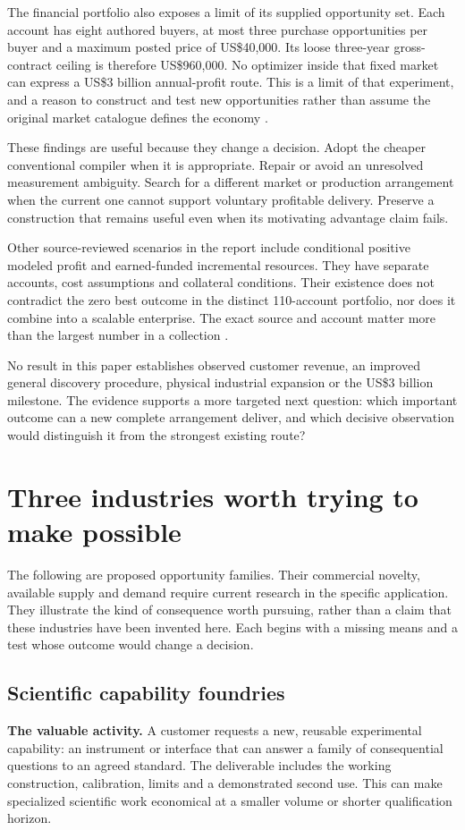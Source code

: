 \documentclass[11pt,letterpaper]{article}
\begin{document}
The financial portfolio also exposes a limit of its supplied opportunity set. Each account has eight authored buyers, at most three purchase opportunities per buyer and a maximum posted price of US\$40,000. Its loose three-year gross-contract ceiling is therefore US\$960,000. No optimizer inside that fixed market can express a US\$3 billion annual-profit route. This is a limit of that experiment, and a reason to construct and test new opportunities rather than assume the original market catalogue defines the economy \cite{r2}.

These findings are useful because they change a decision. Adopt the cheaper conventional compiler when it is appropriate. Repair or avoid an unresolved measurement ambiguity. Search for a different market or production arrangement when the current one cannot support voluntary profitable delivery. Preserve a construction that remains useful even when its motivating advantage claim fails.

Other source-reviewed scenarios in the report include conditional positive modeled profit and earned-funded incremental resources. They have separate accounts, cost assumptions and collateral conditions. Their existence does not contradict the zero best outcome in the distinct 110-account portfolio, nor does it combine into a scalable enterprise. The exact source and account matter more than the largest number in a collection \cite{report20261102}.

No result in this paper establishes observed customer revenue, an improved general discovery procedure, physical industrial expansion or the US\$3 billion milestone. The evidence supports a more targeted next question: which important outcome can a new complete arrangement deliver, and which decisive observation would distinguish it from the strongest existing route?

\section{Three industries worth trying to make possible}
The following are proposed opportunity families. Their commercial novelty, available supply and demand require current research in the specific application. They illustrate the kind of consequence worth pursuing, rather than a claim that these industries have been invented here. Each begins with a missing means and a test whose outcome would change a decision.

\subsection{Scientific capability foundries}
\textbf{The valuable activity.} A customer requests a new, reusable experimental capability: an instrument or interface that can answer a family of consequential questions to an agreed standard. The deliverable includes the working construction, calibration, limits and a demonstrated second use. This can make specialized scientific work economical at a smaller volume or shorter qualification horizon.
\end{document}
